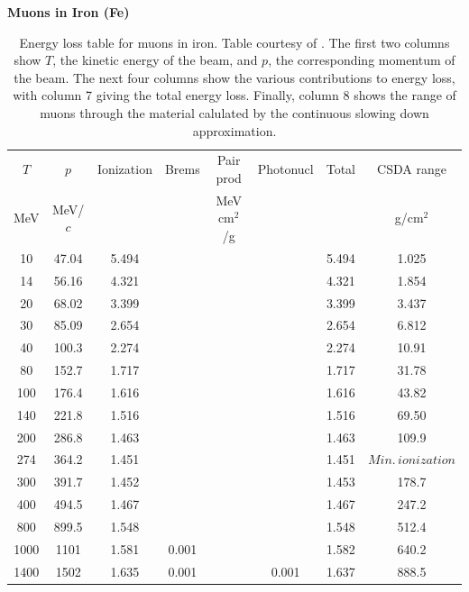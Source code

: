 \begin{table}
\caption*{\textbf{Muons in Iron (Fe)}}
\begin{tabularx}{\textwidth}{cccccccc}
\hline \hline
$T$ & $p$ & Ionization & Brems & Pair prod & Photonucl & Total & CSDA range\vspace{-12pt}\\
MeV & MeV/$c$ & \multicolumn{2}{c}{\sout{\hspace{3cm}}} & MeV cm$^2$/g & \multicolumn{2}{c}{\sout{\hspace{3cm}}} & g/cm$^2$\\ \hline
10 & 47.04 & 5.494 & &&& 5.494 & 1.025\vspace{-12pt}\\
14 & 56.16 & 4.321 & & & & 4.321 & 1.854\vspace{-12pt}\\
20 & 68.02 & 3.399 &  &   &  			& 3.399 & 3.437 \vspace{-12pt}\\
30 & 85.09 & 2.654 &  &  &  			& 2.654 & 6.812 \vspace{-12pt}\\
40 & 100.3 & 2.274 &  &  &  			& 2.274 & 10.91 \vspace{-12pt}\\
80 & 152.7 & 1.717 &  &  &  			& 1.717 & 31.78 \vspace{-12pt}\\
100 & 176.4 & 1.616 & &   &  			& 1.616 & 43.82 \vspace{-12pt}\\
140 & 221.8 & 1.516 & &   &  			& 1.516 & 69.50 \vspace{-12pt}\\
200 & 286.8 & 1.463 & &   &  			& 1.463 & 109.9 \vspace{-12pt}\\
274 & 364.2 & 1.451 & &   &  			& 1.451 & $Min.\, ionization$ \vspace{-12pt}\\
300 & 391.7 & 1.452 & &   &  			& 1.453 & 178.7 \vspace{-12pt}\\
400 & 494.5 & 1.467 & &   &  			& 1.467 & 247.2 \vspace{-12pt}\\
800 & 899.5 & 1.548 & &   &  			& 1.548 & 512.4 \vspace{-12pt}\\
1000 & 1101 & 1.581  & 0.001 & &  		& 1.582 & 640.2 \vspace{-12pt}\\
1400 & 1502 & 1.635  & 0.001 & & 0.001 	& 1.637 & 888.5\\
\hline
\end{tabularx}
\caption[Energy loss table for muons in iron.]{Energy loss table for muons in iron. Table courtesy of \cite{PDGTables}. The first two columns show $T$, the kinetic energy of the beam, and $p$, the corresponding momentum of the beam. The next four columns show the various contributions to energy loss, with column 7 giving the total energy loss. Finally, column 8 shows the range of muons through the material calulated by the continuous slowing down approximation.}
\label{tbl:elossfe}
\end{table}


